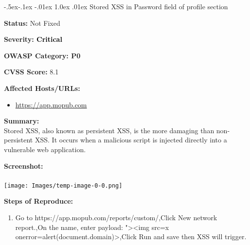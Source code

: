\documentclass{article}
\makeatletter
\renewcommand{\subsection}{\@startsection{subsection}{2}{\z@}%
            {-.5ex\@plus -.1ex \@minus -.01ex}%
            {1.0ex \@plus .01ex}%
            {\normalfont\large\color{subsectioncolor}}}
\makeatother
\begin{document}
                    \subsection{\large Stored XSS in Password field of profile section	}
                    \begin{description}[itemsep=2pt, leftmargin=0.2cm]
                        \item \large \textbf{Status:} Not Fixed
                        \item \large \textbf{Severity: \textcolor{infotext} {Critical}}
                        \item \large \textbf{OWASP Category: P0}
                        \item \large \textbf{CVSS Score:} 8.1 
                        \item \large \textbf{Affected Hosts/URLs:}
                            \begin{itemize} 
                            \item \large \href{https://app.mopub.com} {https://app.mopub.com}
                            \end{itemize}
                        \item \large \textbf{Summary:} \\  Stored XSS, also known as persistent XSS, is the more damaging than non-persistent XSS. It occurs when a malicious script is injected directly into a vulnerable web application.

                        \item \large \textbf{Screenshot:} \\ \\
                            \texttt{[image: Images/temp-image-0-0.png]} \\

                        \item \large \textbf{Steps of Reproduce:}
                        \linespread{1.0}
                        \begin{enumerate}[leftmargin=0.5cm]
                            
                        \item \large Go to https://app.mopub.com/reports/custom/,Click New network report.,On the name, enter payload: "><img src=x onerror=alert(document.domain)>,Click Run and save then XSS will trigger.
                        \end{enumerate}
                        

\end{description}
\end{document}
